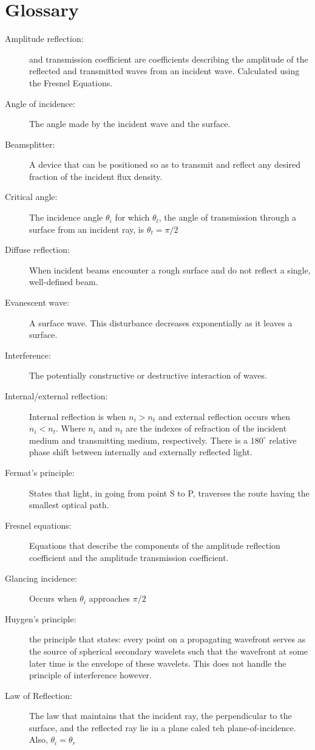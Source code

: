 \documentclass[12pt]{report}
\begin{document}
\section{Glossary}
\begin{description}
\item[Amplitude reflection: ] and transmission coefficient are coefficients describing the amplitude of the reflected and transmitted waves from an incident wave. Calculated using the Fresnel Equations. 
\item[Angle of incidence: ] The angle made by the incident wave and the surface. 
\item[Beamsplitter: ] A device that can be positioned so as to transmit and reflect any desired fraction of the incident flux density. 
\item[Critical angle: ] The incidence angle $\theta_i$ for which $\theta_t$, the angle of transmission through a surface from an incident ray, is  $\theta_t=\pi/2$
\item[Diffuse reflection: ] When incident beams encounter a rough surface and do not reflect a single, well-defined beam.
\item[Evanescent wave: ] A surface wave. This disturbance decreases exponentially as it leaves a surface. 
\item[Interference: ] The potentially constructive or destructive interaction of waves. 
\item[Internal/external reflection: ] Internal reflection is when $n_i>n_t$ and external reflection occurs when $n_i<n_t$. Where $n_i$ and $n_t$ are the indexes of refraction of the incident medium and transmitting medium, respectively. There is a $180^\circ$ relative phase shift between internally and externally reflected light. 
\item[Fermat's principle: ] States that light, in going from point S to P, traverses the route having the smallest optical path. 
\item[Fresnel equations: ] Equations that describe the components of the amplitude reflection coefficient and the amplitude transmission coefficient. 
\item[Glancing incidence: ] Occurs when $\theta_i$ approaches $\pi/2$
\item[Huygen's principle: ] the principle that states: every point on a propagating wavefront serves as the source of spherical secondary wavelets such that the wavefront at some later time is the envelope of these wavelets. This does not handle the principle of interference however. 
\item[Law of Reflection: ] The law that maintains that the incident ray, the perpendicular to the surface, and the reflected ray lie in a plane caled teh plane-of-incidence. Also, $\theta_i = \theta_r$

\end{description}
\end{document}
